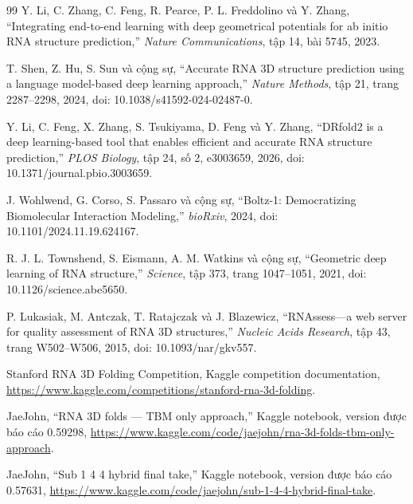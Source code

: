 \documentclass[12pt,a4paper,oneside]{report}
\begin{document}
\begin{thebibliography}{99}
Y. Li, C. Zhang, C. Feng, R. Pearce, P. L. Freddolino và Y. Zhang,
``Integrating end-to-end learning with deep geometrical potentials for ab initio RNA
structure prediction,''
\emph{Nature Communications}, tập 14, bài 5745, 2023.

T. Shen, Z. Hu, S. Sun và cộng sự,
``Accurate RNA 3D structure prediction using a language model-based deep learning approach,''
\emph{Nature Methods}, tập 21, trang 2287--2298, 2024,
doi: 10.1038/s41592-024-02487-0.

Y. Li, C. Feng, X. Zhang, S. Tsukiyama, D. Feng và Y. Zhang,
``DRfold2 is a deep learning-based tool that enables efficient and accurate RNA
structure prediction,''
\emph{PLOS Biology}, tập 24, số 2, e3003659, 2026,
doi: 10.1371/journal.pbio.3003659.

J. Wohlwend, G. Corso, S. Passaro và cộng sự,
``Boltz-1: Democratizing Biomolecular Interaction Modeling,''
\emph{bioRxiv}, 2024,
doi: 10.1101/2024.11.19.624167.

R. J. L. Townshend, S. Eismann, A. M. Watkins và cộng sự,
``Geometric deep learning of RNA structure,''
\emph{Science}, tập 373, trang 1047--1051, 2021,
doi: 10.1126/science.abe5650.

P. Lukasiak, M. Antczak, T. Ratajczak và J. Blazewicz,
``RNAssess---a web server for quality assessment of RNA 3D structures,''
\emph{Nucleic Acids Research}, tập 43, trang W502--W506, 2015,
doi: 10.1093/nar/gkv557.

Stanford RNA 3D Folding Competition,
Kaggle competition documentation,
\url{https://www.kaggle.com/competitions/stanford-rna-3d-folding}.

JaeJohn,
``RNA 3D folds --- TBM only approach,'' Kaggle notebook, version được báo cáo 0.59298,
\url{https://www.kaggle.com/code/jaejohn/rna-3d-folds-tbm-only-approach}.

JaeJohn,
``Sub 1 4 4 hybrid final take,'' Kaggle notebook, version được báo cáo 0.57631,
\url{https://www.kaggle.com/code/jaejohn/sub-1-4-4-hybrid-final-take}.

\end{thebibliography}
\end{document}

